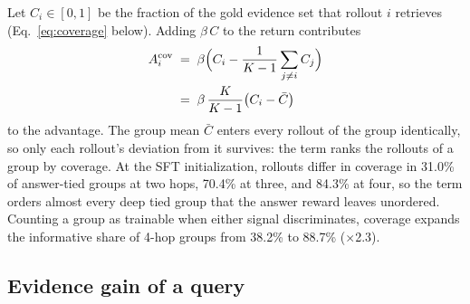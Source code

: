 Let $C_i \in [0,1]$ be the fraction of the gold evidence set that
rollout $i$ retrieves (Eq.~\ref{eq:coverage} below). Adding
$\beta\,C$ to the return contributes
\begin{equation}
\begin{split}
A^{\mathrm{cov}}_i \;&=\; \beta\Bigl(C_i - \frac{1}{K-1}\sum_{j\neq i}
C_j\Bigr) \\
&=\; \beta\,\frac{K}{K-1}\bigl(C_i - \bar{C}\bigr)
\end{split}
\label{eq:cov-advantage}
\end{equation}
to the advantage. The group mean $\bar{C}$ enters every rollout of
the group identically, so only each rollout's deviation from it
survives: the term ranks the rollouts of a group by coverage. At the
SFT initialization, rollouts differ in coverage in 31.0\% of
answer-tied groups at two hops, 70.4\% at three, and 84.3\% at four,
so the term orders almost every deep tied group that the answer reward
leaves unordered. Counting a group as trainable when either signal
discriminates, coverage expands the informative share of 4-hop groups
from 38.2\% to 88.7\% ($\times$2.3).

\subsection{Evidence gain of a query}
\label{sec:method-gain}

